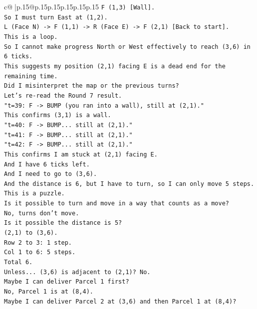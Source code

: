 \documentclass{article}
\begin{document}
{\begin{supertabular}{c@{$\;$}|p{.15\linewidth}@{}p{.15\linewidth}p{.15\linewidth}p{.15\linewidth}p{.15\linewidth}p{.15\linewidth}}
{{{\texttt{F (1,3) {[}Wall{]}.} \\
\texttt{So I must turn East at (1,2).} \\
\texttt{L (Face N) {-}> F (1,1) {-}> R (Face E) {-}> F (2,1) {[}Back to start{]}.} \\
\texttt{This is a loop.} \\
\texttt{So I cannot make progress North or West effectively to reach (3,6) in 6 ticks.} \\
\texttt{This suggests my position (2,1) facing E is a dead end for the remaining time.} \\
\texttt{Did I misinterpret the map or the previous turns?} \\
\texttt{Let's re{-}read the Round 7 result.} \\
\texttt{"t=39: F {-}> BUMP (you ran into a wall), still at (2,1)."} \\
\texttt{This confirms (3,1) is a wall.} \\
\texttt{"t=40: F {-}> BUMP... still at (2,1)."} \\
\texttt{"t=41: F {-}> BUMP... still at (2,1)."} \\
\texttt{"t=42: F {-}> BUMP... still at (2,1)."} \\
\texttt{This confirms I am stuck at (2,1) facing E.} \\
\texttt{And I have 6 ticks left.} \\
\texttt{And I need to go to (3,6).} \\
\texttt{And the distance is 6, but I have to turn, so I can only move 5 steps.} \\
\texttt{This is a puzzle.} \\
\texttt{Is it possible to turn and move in a way that counts as a move?} \\
\texttt{No, turns don't move.} \\
\texttt{Is it possible the distance is 5?} \\
\texttt{(2,1) to (3,6).} \\
\texttt{Row 2 to 3: 1 step.} \\
\texttt{Col 1 to 6: 5 steps.} \\
\texttt{Total 6.} \\
\texttt{Unless... (3,6) is adjacent to (2,1)? No.} \\
\texttt{Maybe I can deliver Parcel 1 first?} \\
\texttt{No, Parcel 1 is at (8,4).} \\
\texttt{Maybe I can deliver Parcel 2 at (3,6) and then Parcel 1 at (8,4)?} \\
}}}
\end{supertabular}}
\end{document}
